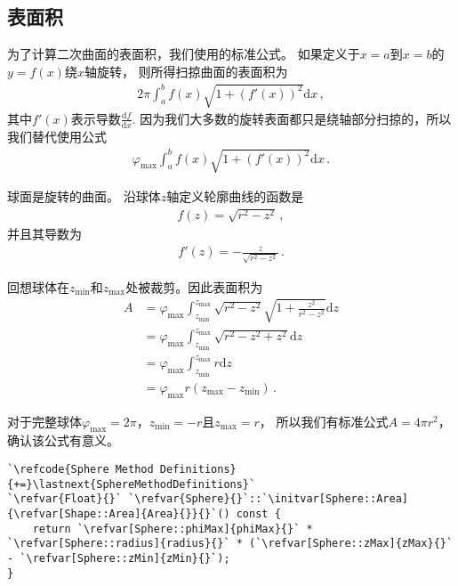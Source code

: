 \subsection{表面积}\label{sub:表面积2}
为了计算二次曲面的表面积，我们使用的标准公式。
如果定义于$x=a$到$x=b$的$y=f(x)$绕$x$轴旋转，
则所得扫掠曲面的表面积为
\begin{align*}
    2\pi\int_a^b{f(x)\sqrt{1+(f'(x))^2}\mathrm{d}x}\, ,
\end{align*}
其中$f'(x)$表示导数$\displaystyle\frac{\mathrm{d}f}{\mathrm{d}x}$.
因为我们大多数的旋转表面都只是绕轴部分扫掠的，所以我们替代使用公式
\begin{align*}
    \varphi_{\max}\int_a^b{f(x)\sqrt{1+(f'(x))^2}\mathrm{d}x}\, .
\end{align*}

球面是旋转的曲面。
沿球体$z$轴定义轮廓曲线的函数是
\begin{align*}
    f(z)=\sqrt{r^2-z^2}\, ,
\end{align*}
并且其导数为
\begin{align*}
    f'(z)=-\frac{z}{\sqrt{r^2-z^2}}\, .
\end{align*}

回想球体在$z_{\min}$和$z_{\max}$处被裁剪。因此表面积为
\begin{align*}
    A & =\varphi_{\max}\int_{z_{\min}}^{z_{\max}}{\sqrt{r^2-z^2}\sqrt{1+\frac{z^2}{r^2-z^2}}\mathrm{d}z} \\
      & =\varphi_{\max}\int_{z_{\min}}^{z_{\max}}{\sqrt{r^2-z^2+z^2}\mathrm{d}z}                         \\
      & =\varphi_{\max}\int_{z_{\min}}^{z_{\max}}{r\mathrm{d}z}                                          \\
      & =\varphi_{\max}r(z_{\max}-z_{\min})\, .
\end{align*}

对于完整球体$\varphi_{\max}=2\pi$，$z_{\min}=-r$且$z_{\max}=r$，
所以我们有标准公式$A=4\pi r^2$，确认该公式有意义。
\begin{lstlisting}
`\refcode{Sphere Method Definitions}{+=}\lastnext{SphereMethodDefinitions}`
`\refvar{Float}{}` `\refvar{Sphere}{}`::`\initvar[Sphere::Area]{\refvar[Shape::Area]{Area}{}}{}`() const {
    return `\refvar[Sphere::phiMax]{phiMax}{}` * `\refvar[Sphere::radius]{radius}{}` * (`\refvar[Sphere::zMax]{zMax}{}` - `\refvar[Sphere::zMin]{zMin}{}`);
}
\end{lstlisting}